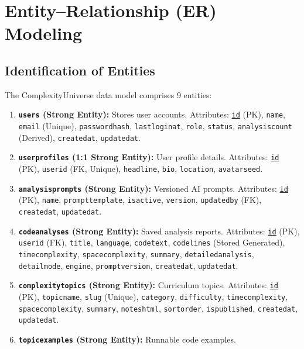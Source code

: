 \documentclass[12pt,a4paper]{report}
\DeclareRobustCommand{\_}{\textunderscore\allowbreak}
\begin{document}
\chapter{Entity--Relationship (ER) Modeling}

\section{Identification of Entities}
The ComplexityUniverse data model comprises 9 entities:

\begin{enumerate}
    \item \textbf{\texttt{users} (Strong Entity):} Stores user accounts.
    Attributes: \underline{\texttt{id}} (PK), \texttt{name}, \texttt{email} (Unique), \texttt{password\_hash}, \texttt{last\_login\_at}, \texttt{role}, \texttt{status}, \texttt{analysis\_count} (Derived), \texttt{created\_at}, \texttt{updated\_at}.
    \item \textbf{\texttt{user\_profiles} (1:1 Strong Entity):} User profile details.
    Attributes: \underline{\texttt{id}} (PK), \texttt{user\_id} (FK, Unique), \texttt{headline}, \texttt{bio}, \texttt{location}, \texttt{avatar\_seed}.
    \item \textbf{\texttt{analysis\_prompts} (Strong Entity):} Versioned AI prompts.
    Attributes: \underline{\texttt{id}} (PK), \texttt{name}, \texttt{prompt\_template}, \texttt{is\_active}, \texttt{version}, \texttt{updated\_by} (FK), \texttt{created\_at}, \texttt{updated\_at}.
    \item \textbf{\texttt{code\_analyses} (Strong Entity):} Saved analysis reports.
    Attributes: \underline{\texttt{id}} (PK), \texttt{user\_id} (FK), \texttt{title}, \texttt{language}, \texttt{code\_text}, \texttt{code\_lines} (Stored Generated), \texttt{time\_complexity}, \texttt{space\_complexity}, \texttt{summary}, \texttt{detailed\_analysis}, \texttt{detail\_mode}, \texttt{engine}, \texttt{prompt\_version}, \texttt{created\_at}, \texttt{updated\_at}.
    \item \textbf{\texttt{complexity\_topics} (Strong Entity):} Curriculum topics.
    Attributes: \underline{\texttt{id}} (PK), \texttt{topic\_name}, \texttt{slug} (Unique), \texttt{category}, \texttt{difficulty}, \texttt{time\_complexity}, \texttt{space\_complexity}, \texttt{summary}, \texttt{notes\_html}, \texttt{sort\_order}, \texttt{is\_published}, \texttt{created\_at}, \texttt{updated\_at}.
    \item \textbf{\texttt{topic\_examples} (Strong Entity):} Runnable code examples.

\end{enumerate}
\end{document}
